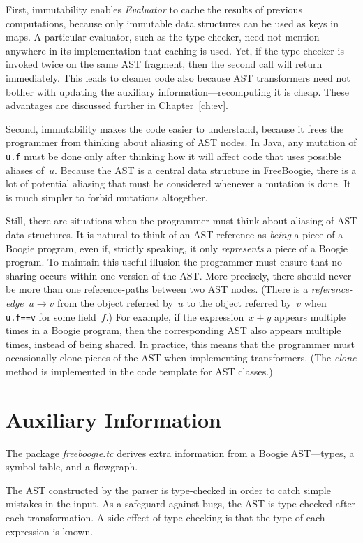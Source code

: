 \documentclass{llncs}
\newcommand{\jmlCode}{\lstinline[style=jml,basicstyle=\normalsize]}
\begin{document}
First, immutability enables \textit{Evaluator} to cache the
results of previous computations, because only immutable data
structures can be used as keys in maps. A particular evaluator,
such as the type-checker, need not mention anywhere in its
implementation that caching is used. Yet, if the type-checker
is invoked twice on the same AST fragment, then the second call
will return immediately. This leads to cleaner code also because
AST transformers need not bother with updating the auxiliary
information---recomputing it is cheap. These advantages are
discussed further in Chapter~\ref{ch:ev}.

Second, immutability makes the code easier to understand, because
it frees the programmer from thinking about aliasing of AST nodes.
In Java, any mutation of \jmlCode|u.f| must be done only after
thinking how it will affect code that uses possible aliases of~$u$.
Because the AST is a central data structure in FreeBoogie, there
is a lot of potential aliasing that must be considered whenever
a mutation is done. It is much simpler to forbid mutations altogether.

Still, there are situations when the programmer must think about
aliasing of AST data structures. It is natural to think of an
AST reference as \emph{being} a piece of a Boogie program,
even if, strictly speaking, it only \emph{represents} a piece
of a Boogie program. To maintain this useful illusion the
programmer must ensure that no sharing occurs within one version
of the AST\null. More precisely, there should never be more
than one reference-paths between two AST nodes. (There is a
\emph{reference-edge}~$u\to v$ from the object referred by~$u$
to the object referred by~$v$ when \jmlCode|u.f==v| for some
field~$f$.) For example, if the expression~$x+y$ appears multiple
times in a Boogie program, then the corresponding AST also
appears multiple times, instead of being shared. In practice,
this means that the programmer must occasionally clone pieces
of the AST when implementing transformers. (The \textit{clone}
method is implemented in the code template for AST classes.)

\section{Auxiliary Information}

The package \textit{freeboogie.tc} derives extra information from
a Boogie AST---types, a symbol table, and a flowgraph.

The AST constructed by the parser is type-checked in order to
catch simple mistakes in the input. As a safeguard against bugs,
the AST is type-checked after each transformation. A side-effect
of type-checking is that the type of each expression is known.
\end{document}
